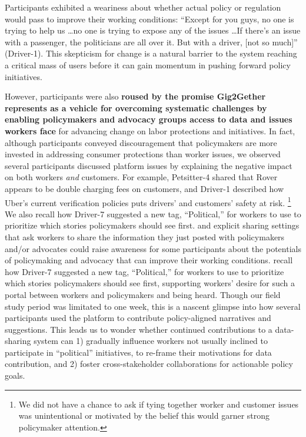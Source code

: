Participants exhibited a weariness about whether actual policy or regulation would pass to improve their working conditions: ``Except for you guys, no one is trying to help us \dots no one is trying to expose any of the issues \dots If there's an issue with a passenger, the politicians are all over it. But with a driver, [not so much]'' (Driver-1). This skepticism for change is a natural barrier to the system reaching a critical mass of users before it can gain momentum in pushing forward policy initiatives.

However, participants were also \textbf{roused by the promise Gig2Gether represents as a vehicle for overcoming systematic challenges by enabling policymakers and advocacy groups access to data and issues workers face} for advancing change on labor {protections and initiatives}. {In fact, although participants} conveyed discouragement that policymakers are more invested in addressing consumer protections than worker issues, we observed several participants discussed platform issues by explaining the negative impact on both workers \textit{and} customers. For example, Petsitter-4 shared that Rover appears to be double charging fees on customers, and Driver-1 described how Uber's current verification policies puts drivers' and customers' safety at risk. \footnote{{We did not have a chance to ask if tying together worker and customer issues was unintentional or motivated by the belief this would garner strong policymaker attention.}} {We also recall} how Driver-7 suggested a new tag, ``Political,'' for workers to use to prioritize which stories policymakers should see first.
 and explicit sharing settings that ask workers to share the information they just posted with policymakers and/or advocates could raise awareness for some participants about the potentials of policymaking and advocacy that can improve their working conditions.
recall how Driver-7 suggested a new tag, ``Political,'' for workers to use to prioritize which stories policymakers should see first, supporting workers' desire for such a portal between workers and policymakers and being heard.
%
{Though our field study period was limitated to one week, this is a nascent glimpse into how several participants used the platform to contribute policy-aligned narratives and suggestions. This leads us to wonder whether continued contributions to a data-sharing system can 1) gradually influence workers not usually inclined to participate in ``political'' initiatives, to re-frame their motivations for data contribution, and 2) foster cross-stakeholder collaborations for actionable policy goals.}

